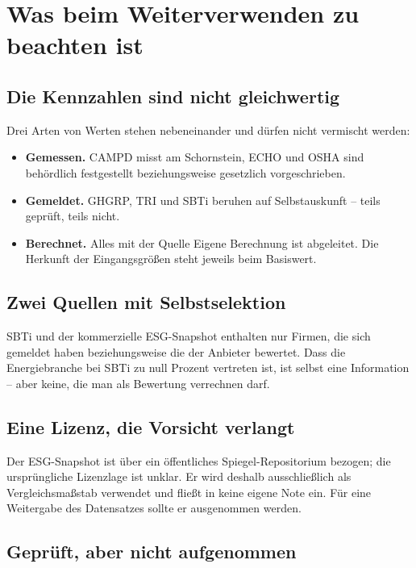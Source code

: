 \documentclass[11pt,a4paper]{article}
\begin{document}
\section{Was beim Weiterverwenden zu beachten ist}

\subsection{Die Kennzahlen sind nicht gleichwertig}

Drei Arten von Werten stehen nebeneinander und dürfen nicht vermischt werden:

\begin{itemize}
\item \textbf{Gemessen.} CAMPD misst am Schornstein, ECHO und OSHA sind behördlich festgestellt beziehungsweise gesetzlich vorgeschrieben.
\item \textbf{Gemeldet.} GHGRP, TRI und SBTi beruhen auf Selbstauskunft -- teils geprüft, teils nicht.
\item \textbf{Berechnet.} Alles mit der Quelle \glqq Eigene Berechnung\grqq{} ist abgeleitet. Die Herkunft der Eingangsgrößen steht jeweils beim Basiswert.
\end{itemize}

\subsection{Zwei Quellen mit Selbstselektion}

SBTi und der kommerzielle ESG-Snapshot enthalten nur Firmen, die sich gemeldet haben beziehungsweise die der Anbieter bewertet. Dass die Energiebranche bei SBTi zu null Prozent vertreten ist, ist selbst eine Information -- aber keine, die man als Bewertung verrechnen darf.

\subsection{Eine Lizenz, die Vorsicht verlangt}

Der ESG-Snapshot ist über ein öffentliches Spiegel-Repositorium bezogen; die ursprüngliche Lizenzlage ist unklar. Er wird deshalb ausschließlich als Vergleichsmaßstab verwendet und fließt in keine eigene Note ein. Für eine Weitergabe des Datensatzes sollte er ausgenommen werden.

\subsection{Geprüft, aber nicht aufgenommen}
\end{document}
